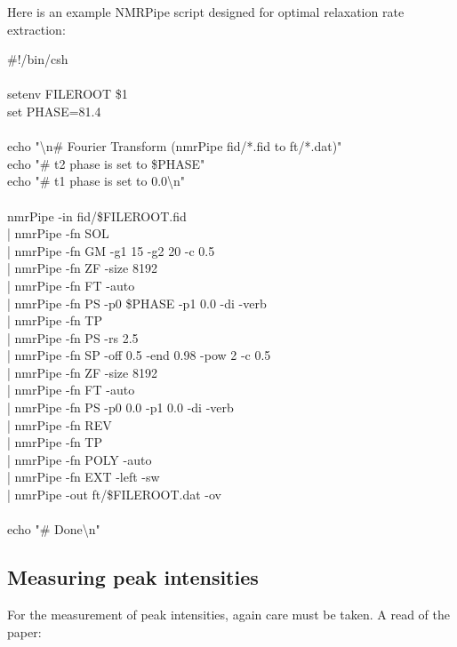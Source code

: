 Here is an example NMRPipe script designed for optimal relaxation rate extraction:

\begin{exampleenv}
\#!/bin/csh \\
 \\
setenv FILEROOT \$1 \\
set PHASE=81.4 \\
 \\
echo "\textbackslash n\# Fourier Transform (nmrPipe fid/*.fid to ft/*.dat)" \\
echo "\# t2 phase is set to \$PHASE" \\
echo "\# t1 phase is set to 0.0\textbackslash n" \\
 \\
nmrPipe -in fid/\$FILEROOT.fid \ \\
| nmrPipe -fn SOL \ \\
| nmrPipe -fn GM -g1 15 -g2 20 -c 0.5 \ \\
| nmrPipe -fn ZF -size 8192 \ \\
| nmrPipe -fn FT -auto \ \\
| nmrPipe -fn PS -p0 \$PHASE -p1 0.0 -di -verb \ \\
| nmrPipe -fn TP \ \\
| nmrPipe -fn PS -rs 2.5 \ \\
| nmrPipe -fn SP -off 0.5 -end 0.98 -pow 2 -c 0.5 \ \\
| nmrPipe -fn ZF -size 8192 \ \\
| nmrPipe -fn FT -auto \ \\
| nmrPipe -fn PS -p0 0.0 -p1 0.0 -di -verb \ \\
| nmrPipe -fn REV \ \\
| nmrPipe -fn TP \ \\
| nmrPipe -fn POLY -auto \ \\
| nmrPipe -fn EXT -left -sw \ \\
| nmrPipe -out ft/\$FILEROOT.dat -ov \\
 \\
echo "\# Done\textbackslash n"
\end{exampleenv}



\subsection{Measuring peak intensities}

For the measurement of peak intensities, again care must be taken.  A read of the paper:

